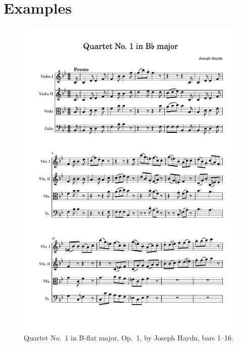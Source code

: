 \documentclass[12pt]{article}
\theoremstyle{definition}
\begin{document}
\section{Examples}
\label{app:examples}

\begin{figure}
    \includegraphics[width=\textwidth,page=1]{haydn-score.pdf}
    \caption{Quartet No.\ 1 in B-flat major, Op.\ 1, by Joseph Haydn, bars 1--16.}
\end{figure}
\end{document}
